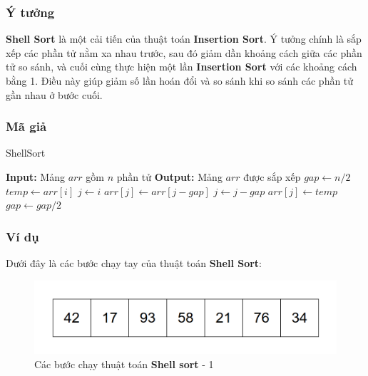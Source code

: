 \subsubsection{Ý tưởng}
\textbf{Shell Sort} là một cải tiến của thuật toán \textbf{Insertion Sort}. Ý tưởng chính là sắp xếp các phần tử nằm xa nhau trước, sau đó giảm dần khoảng cách giữa các phần tử so sánh, và cuối cùng thực hiện một lần \textbf{Insertion Sort} với các khoảng cách bằng 1. Điều này giúp giảm số lần hoán đổi và so sánh khi so sánh các phần tử gần nhau ở bước cuối.\cite{sedgewick1996analysis}

\subsubsection{Mã giả}
\begin{algorithm}[H]
\caption{ShellSort}
\begin{algorithmic}[1]
    \State \textbf{Input:} Mảng $arr$ gồm $n$ phần tử
    \State \textbf{Output:} Mảng $arr$ được sắp xếp
    \State $gap \gets n/2$
            \State $temp \gets arr[i]$
            \State $j \gets i$
                \State $arr[j] \gets arr[j - gap]$
                \State $j \gets j - gap$
            \EndWhile
            \State $arr[j] \gets temp$
        \EndFor
        \State $gap \gets gap / 2$
    \EndWhile
\EndProcedure
\end{algorithmic}
\end{algorithm}
\subsubsection{Ví dụ}
Dưới đây là các bước chạy tay của thuật toán \textbf{Shell Sort}:

\begin{figure}[H]
    \centering
    \includegraphics[width=0.5\linewidth]{img/shell_sort/1.png}
    \caption{Các bước chạy thuật toán \textbf{Shell sort} - 1}
\end{figure}

